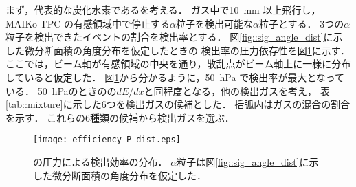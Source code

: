 \documentclass[../master]{subfiles}
\begin{document}
まず，代表的な炭化水素である\Methane を考える．
ガス中で\SI{10}{\milli\metre} 以上飛行し，MAIKo TPC の有感領域中で停止する$\alpha$粒子を検出可能な$\alpha$粒子とする．
3つの$\alpha$粒子を検出できたイベントの割合を検出率とする．
図\ref{fig::sig_angle_dist}に示した微分断面積の角度分布を仮定したときの
検出率の圧力依存性を図\ref{fig::efficiency_P_dist}に示す．
ここでは，ビーム軸が有感領域の中央を通り，散乱点がビーム軸上に一様に分布していると仮定した．
図\ref{fig::efficiency_P_dist}から分かるように，\SI{50}{\hecto\pascal} で検出率が最大となっている．
\SI{50}{\hecto\pascal}のときの\Methane の$dE/dx$と同程度となる，他の検出ガスを考え，
表\ref{tab::mixture}に示した6つを検出ガスの候補とした．
括弧内はガスの混合の割合を示す．
これらの6種類の候補から検出ガスを選ぶ．
\begin{figure}
  \centering
  \texttt{[image: efficiency\_P\_dist.eps]}
  \caption[\Methane の圧力による検出効率の分布．]
          {\Methane の圧力による検出効率の分布．
            $\alpha$粒子は図\ref{fig::sig_angle_dist}に示した微分断面積の角度分布を仮定した．
           }
  \label{fig::efficiency_P_dist}
\end{figure}
\end{document}
